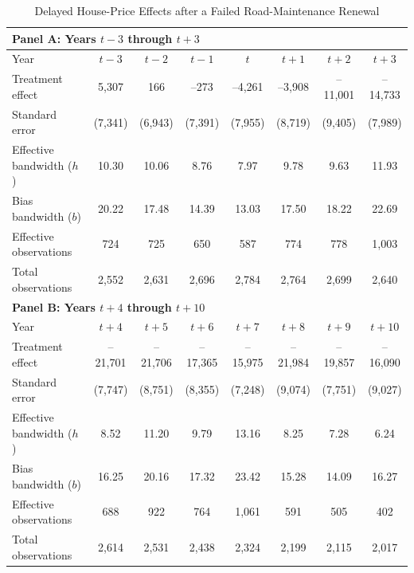 \begin{table}[H]
  \centering
  \caption{Delayed House-Price Effects after a Failed Road-Maintenance Renewal}
  \label{tab:median_sale_amount}
  \begin{threeparttable}
    \begin{tabular}{p{4.5cm}ccccccc}
    \toprule
    \multicolumn{8}{l}{\textbf{Panel A: Years $t-3$ through $t+3$}}\\
    \midrule
    Year       & $t\!-\!3$ & $t\!-\!2$ & $t\!-\!1$ & $t$ & $t\!+\!1$ & $t\!+\!2$ & $t\!+\!3$\\
    \midrule
    Treatment effect           &  5,307 &     166 &    –273 &  –4,261 &  –3,908 & –11,001 & –14,733 \\
    Standard error             & (7,341)& (6,943)& (7,391) & (7,955) & (8,719) & (9,405) & (7,989) \\
    Effective bandwidth ($h$)  & 10.30  & 10.06 &  8.76  &  7.97  &  9.78  &  9.63  & 11.93  \\
    Bias bandwidth ($b$)       & 20.22  & 17.48 & 14.39  & 13.03  & 17.50  & 18.22  & 22.69  \\
    Effective observations     &   724  &   725  &   650  &   587  &   774  &   778  & 1,003  \\
    Total observations         & 2,552  & 2,631  & 2,696  & 2,784  & 2,764  & 2,699  & 2,640  \\
    \midrule
    \multicolumn{8}{l}{\textbf{Panel B: Years $t+4$ through $t+10$}}\\
    \midrule
    Year       & $t\!+\!4$ & $t\!+\!5$ & $t\!+\!6$ & $t\!+\!7$ & $t\!+\!8$ & $t\!+\!9$ & $t\!+\!10$\\
    \midrule
    Treatment effect           & –21,701 & –21,706 & –17,365 & –15,975 & –21,984 & –19,857 & –16,090 \\
    Standard error             &  (7,747)&  (8,751)&  (8,355)&  (7,248)&  (9,074)&  (7,751)&  (9,027) \\
    Effective bandwidth ($h$)  &   8.52 &  11.20 &   9.79 &  13.16 &   8.25 &   7.28 &   6.24 \\
    Bias bandwidth ($b$)       &  16.25 &  20.16 &  17.32 &  23.42 &  15.28 &  14.09 &  16.27 \\
    Effective observations     &    688 &    922 &    764 &  1,061 &    591 &    505 &    402 \\
    Total observations         &  2,614 &  2,531 &  2,438 &  2,324 &  2,199 &  2,115 &  2,017 \\

\end{tabular}
\end{threeparttable}
\end{table}
